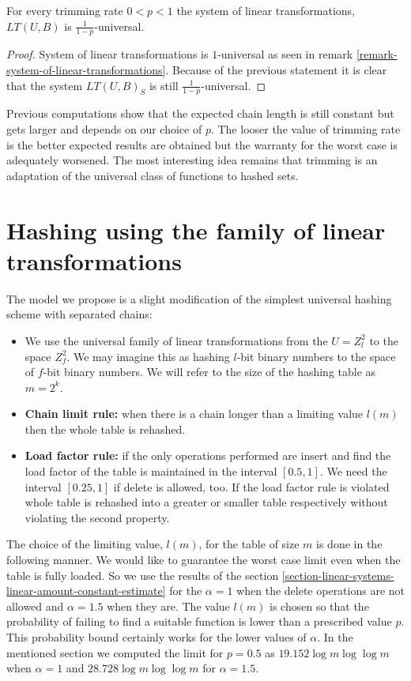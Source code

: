 \begin{corollary}
\label{corollary-trimming-linear}
For every trimming rate $0 < p < 1$ the system of linear transformations, $LT(U, B)$ is $\frac{1}{1 - p}$-universal.
\end{corollary}
\begin{proof}
System of linear transformations is $1$-universal as seen in remark \ref{remark-system-of-linear-transformations}. Because of the previous statement it is clear that the system $LT(U, B)_S$ is still $\frac{1}{1 - p}$-universal.
\end{proof}

Previous computations show that the expected chain length is still constant but gets larger and depends on our choice of $p$. The looser the value of trimming rate is the better expected results are obtained but the warranty for the worst case is adequately worsened. The most interesting idea remains that trimming is an adaptation of the universal class of functions to hashed sets.

\section{Hashing using the family of linear transformations}

The model we propose is a slight modification of the simplest universal hashing scheme with separated chains:
\begin{itemize}
\item We use the universal family of linear transformations from the $U = Z^2_l$ to the space $Z^2_f$. We may imagine this as hashing $l$-bit binary numbers to the space of $f$-bit binary numbers. We will refer to the size of the hashing table as $m = 2^k$.
\item \textbf{Chain limit rule:} when there is a chain longer than a limiting value $l(m)$ then the whole table is rehashed.
\item \textbf{Load factor rule:} if the only operations performed are insert and find the load factor of the table is maintained in the interval $\left[0.5, 1\right]$. We need the interval $\left[0.25, 1\right]$ if delete is allowed, too. If the load factor rule is violated whole table is rehashed into a greater or smaller table respectively without violating the second property.
\end{itemize}

The choice of the limiting value, $l(m)$, for the table of size $m$ is done in the following manner. We would like to guarantee the worst case limit even when the table is fully loaded. So we use the results of the section \ref{section-linear-systems-linear-amount-constant-estimate} for the $\alpha = 1$ when the delete operations are not allowed and $\alpha = 1.5$ when they are. The value $l(m)$ is chosen so that the probability of failing to find a suitable function is lower than a prescribed value $p$. This probability bound certainly works for the lower values of $\alpha$. In the mentioned section we computed the limit for $p = 0.5$ as $19.152 \log m \log \log m$ when $\alpha = 1$ and $28.728 \log m \log \log m$ for $\alpha = 1.5$.

